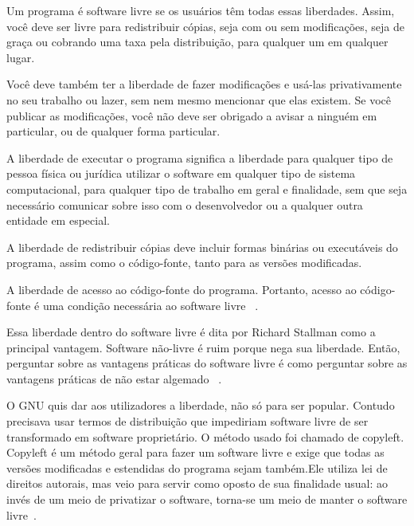 Um programa é software livre se os usuários têm todas essas liberdades. Assim, você deve ser livre para redistribuir cópias, seja com ou sem modificações, seja de graça ou cobrando uma taxa pela distribuição, para qualquer um em qualquer lugar.

Você deve também ter a liberdade de fazer modificações e usá-las privativamente no seu trabalho ou lazer, sem nem mesmo mencionar que elas existem. Se você publicar as modificações, você não deve ser obrigado a avisar a ninguém em particular, ou de qualquer forma particular.

A liberdade de executar o programa significa a liberdade para qualquer tipo de pessoa física ou jurídica utilizar o software em qualquer tipo de sistema computacional, para qualquer tipo de trabalho em geral e finalidade, sem que seja necessário comunicar sobre isso com o desenvolvedor ou a qualquer outra entidade em especial.

A liberdade de redistribuir cópias deve incluir formas binárias ou executáveis do programa, assim como o código-fonte, tanto para as versões modificadas.

A liberdade de acesso ao código-fonte do programa. Portanto, acesso ao código-fonte é uma condição necessária ao software livre ~\cite{gnu2013}.

%
Essa liberdade dentro do software livre é dita por Richard Stallman como a principal vantagem. Software não-livre é ruim porque nega sua liberdade. Então, perguntar sobre as vantagens práticas do software livre é como perguntar sobre as vantagens práticas de não estar algemado ~\cite{stallman2009}.

%
O GNU quis dar aos utilizadores a liberdade, não só para ser popular. Contudo precisava usar termos de distribuição que impediriam software livre de ser transformado em software proprietário. O método usado foi chamado de copyleft. Copyleft é um método geral para fazer um software livre e exige que todas as versões modificadas e estendidas do programa sejam também.Ele utiliza lei de direitos autorais, mas veio para servir como oposto de sua finalidade usual: ao invés de um meio de privatizar o software, torna-se um meio de manter o software livre~\cite{stallman2009}.


